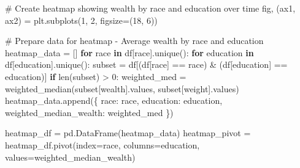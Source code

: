 \documentclass[
  letterpaper,
  DIV=11,
  numbers=noendperiod]{scrartcl}
\newenvironment{Shaded}{\begin{snugshade}}{\end{snugshade}}
\newcommand{\BuiltInTok}[1]{\textcolor[rgb]{0.00,0.23,0.31}{#1}}
\newcommand{\CommentTok}[1]{\textcolor[rgb]{0.37,0.37,0.37}{#1}}
\newcommand{\ControlFlowTok}[1]{\textcolor[rgb]{0.00,0.23,0.31}{\textbf{#1}}}
\newcommand{\DecValTok}[1]{\textcolor[rgb]{0.68,0.00,0.00}{#1}}
\newcommand{\KeywordTok}[1]{\textcolor[rgb]{0.00,0.23,0.31}{\textbf{#1}}}
\newcommand{\NormalTok}[1]{\textcolor[rgb]{0.00,0.23,0.31}{#1}}
\newcommand{\OperatorTok}[1]{\textcolor[rgb]{0.37,0.37,0.37}{#1}}
\newcommand{\StringTok}[1]{\textcolor[rgb]{0.13,0.47,0.30}{#1}}
\begin{document}
\begin{Shaded}
\begin{Highlighting}[]
\CommentTok{\# Create heatmap showing wealth by race and education over time}
\NormalTok{fig, (ax1, ax2) }\OperatorTok{=}\NormalTok{ plt.subplots(}\DecValTok{1}\NormalTok{, }\DecValTok{2}\NormalTok{, figsize}\OperatorTok{=}\NormalTok{(}\DecValTok{18}\NormalTok{, }\DecValTok{6}\NormalTok{))}

\CommentTok{\# Prepare data for heatmap {-} Average wealth by race and education}
\NormalTok{heatmap\_data }\OperatorTok{=}\NormalTok{ []}
\ControlFlowTok{for}\NormalTok{ race }\KeywordTok{in}\NormalTok{ df[}\StringTok{\textquotesingle{}race\textquotesingle{}}\NormalTok{].unique():}
    \ControlFlowTok{for}\NormalTok{ education }\KeywordTok{in}\NormalTok{ df[}\StringTok{\textquotesingle{}education\textquotesingle{}}\NormalTok{].unique():}
\NormalTok{        subset }\OperatorTok{=}\NormalTok{ df[(df[}\StringTok{\textquotesingle{}race\textquotesingle{}}\NormalTok{] }\OperatorTok{==}\NormalTok{ race) }\OperatorTok{\&}\NormalTok{ (df[}\StringTok{\textquotesingle{}education\textquotesingle{}}\NormalTok{] }\OperatorTok{==}\NormalTok{ education)]}
        \ControlFlowTok{if} \BuiltInTok{len}\NormalTok{(subset) }\OperatorTok{\textgreater{}} \DecValTok{0}\NormalTok{:}
\NormalTok{            weighted\_med }\OperatorTok{=}\NormalTok{ weighted\_median(subset[}\StringTok{\textquotesingle{}wealth\textquotesingle{}}\NormalTok{].values, subset[}\StringTok{\textquotesingle{}weight\textquotesingle{}}\NormalTok{].values)}
\NormalTok{            heatmap\_data.append(\{}
                \StringTok{\textquotesingle{}race\textquotesingle{}}\NormalTok{: race,}
                \StringTok{\textquotesingle{}education\textquotesingle{}}\NormalTok{: education,}
                \StringTok{\textquotesingle{}weighted\_median\_wealth\textquotesingle{}}\NormalTok{: weighted\_med}
\NormalTok{            \})}

\NormalTok{heatmap\_df }\OperatorTok{=}\NormalTok{ pd.DataFrame(heatmap\_data)}
\NormalTok{heatmap\_pivot }\OperatorTok{=}\NormalTok{ heatmap\_df.pivot(index}\OperatorTok{=}\StringTok{\textquotesingle{}race\textquotesingle{}}\NormalTok{, columns}\OperatorTok{=}\StringTok{\textquotesingle{}education\textquotesingle{}}\NormalTok{, values}\OperatorTok{=}\StringTok{\textquotesingle{}weighted\_median\_wealth\textquotesingle{}}\NormalTok{)}


\end{Highlighting}
\end{Shaded}
\end{document}
